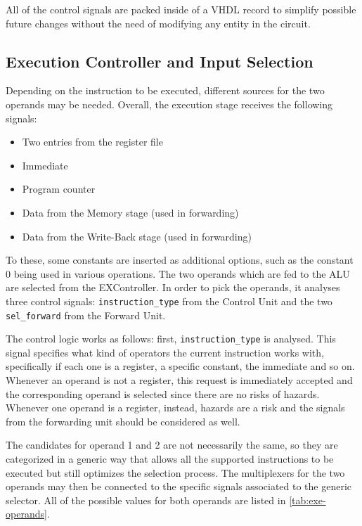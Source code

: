 All of the control signals are packed inside of a VHDL record to simplify possible future changes without the need of
modifying any entity in the circuit.

\subsection{Execution Controller and Input Selection}
Depending on the instruction to be executed, different sources for the two operands may be needed. Overall, the
execution stage receives the following signals:
\begin{itemize}
    \item Two entries from the register file
    \item Immediate
    \item Program counter
    \item Data from the Memory stage (used in forwarding)
    \item Data from the Write-Back stage (used in forwarding)
\end{itemize}
To these, some constants are inserted as additional options, such as the constant 0 being used in various operations.
The two operands which are fed to the ALU are selected from the EXController. In order to
pick the operands, it analyses three control signals: \texttt{instruction\_type} from the Control Unit and the two
\texttt{sel\_forward} from the Forward Unit.

The control logic works as follows: first, \texttt{instruction\_type} is analysed. This signal specifies what kind of
operators the current instruction works with, specifically if each one is a register, a specific constant,
the immediate and so on.
Whenever an operand is not a register, this request is immediately accepted and the corresponding
operand is selected since there are no risks of hazards. Whenever one operand is a register, instead, hazards are
a risk and the signals from the forwarding unit should be considered as well.

The candidates for operand 1 and 2 are not necessarily the same, so they are categorized in a generic way that allows
all the supported instructions to be executed but still optimizes the selection process. The multiplexers for the two
operands may then be connected to the specific signals associated to the generic selector.
All of the possible values for both operands are listed in \autoref{tab:exe-operands}.

